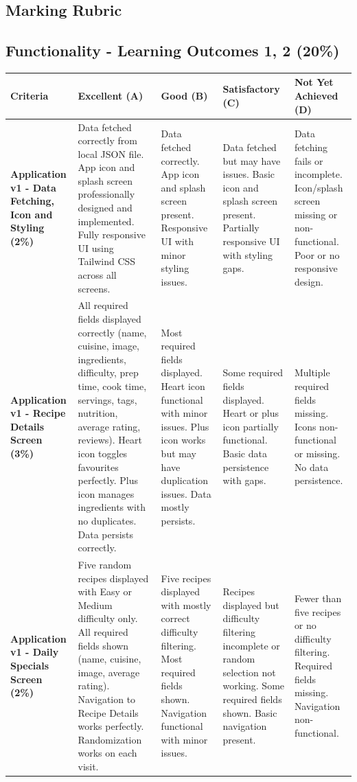 \documentclass{article}
\begin{document}
\begin{landscape}

\section*{Marking Rubric}

\subsection*{Functionality - Learning Outcomes 1, 2 (20\%)}

\renewcommand{\arraystretch}{1.5}
\begin{tabular}{|p{5cm}|p{4cm}|p{4cm}|p{4cm}|p{4cm}|}
\hline
\textbf{Criteria} & \textbf{Excellent (A)} & \textbf{Good (B)} & \textbf{Satisfactory (C)} & \textbf{Not Yet Achieved (D)} \\ \hline

\textbf{Application v1 - Data Fetching, Icon and Styling (2\%)} & 
Data fetched correctly from local JSON file. App icon and splash screen professionally designed and implemented. Fully responsive UI using Tailwind CSS across all screens. & 
Data fetched correctly. App icon and splash screen present. Responsive UI with minor styling issues. & 
Data fetched but may have issues. Basic icon and splash screen present. Partially responsive UI with styling gaps. & 
Data fetching fails or incomplete. Icon/splash screen missing or non-functional. Poor or no responsive design. \\ \hline

\textbf{Application v1 - Recipe Details Screen (3\%)} & 
All required fields displayed correctly (name, cuisine, image, ingredients, difficulty, prep time, cook time, servings, tags, nutrition, average rating, reviews). Heart icon toggles favourites perfectly. Plus icon manages ingredients with no duplicates. Data persists correctly. & 
Most required fields displayed. Heart icon functional with minor issues. Plus icon works but may have duplication issues. Data mostly persists. & 
Some required fields displayed. Heart or plus icon partially functional. Basic data persistence with gaps. & 
Multiple required fields missing. Icons non-functional or missing. No data persistence. \\ \hline

\textbf{Application v1 - Daily Specials Screen (2\%)} & 
Five random recipes displayed with Easy or Medium difficulty only. All required fields shown (name, cuisine, image, average rating). Navigation to Recipe Details works perfectly. Randomization works on each visit. & 
Five recipes displayed with mostly correct difficulty filtering. Most required fields shown. Navigation functional with minor issues. & 
Recipes displayed but difficulty filtering incomplete or random selection not working. Some required fields shown. Basic navigation present. & 
Fewer than five recipes or no difficulty filtering. Required fields missing. Navigation non-functional. \\ \hline


\end{tabular}
\end{landscape}
\end{document}
